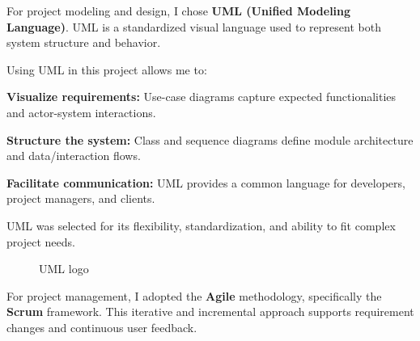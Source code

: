 
{\fontsize{12}{18}\selectfont
\setlength{\parindent}{1.2cm}
\setlength{\parskip}{6pt}

\indent For project modeling and design, I chose \textbf{UML (Unified Modeling Language)}. UML is a standardized visual language used to represent both system structure and behavior. \cite{uml_docs}

\indent Using UML in this project allows me to:

\begin{itemize}[leftmargin=2cm, itemsep=4pt]
  {\fontsize{12}{18}\selectfont
  \item \textbf{Visualize requirements:} Use-case diagrams capture expected functionalities and actor-system interactions.
  \item \textbf{Structure the system:} Class and sequence diagrams define module architecture and data/interaction flows.
  \item \textbf{Facilitate communication:} UML provides a common language for developers, project managers, and clients.
  }
\end{itemize}

\indent UML was selected for its flexibility, standardization, and ability to fit complex project needs.

}

\begin{figure}[H]
  \centering
  \caption{UML logo}
\end{figure}

\vspace{6pt}


{\fontsize{12}{18}\selectfont
\setlength{\parindent}{1.2cm}
\setlength{\parskip}{6pt}

\indent For project management, I adopted the \textbf{Agile} methodology, specifically the \textbf{Scrum} framework. This iterative and incremental approach supports requirement changes and continuous user feedback. \cite{scrum_guide}

}

\vspace{6pt}


